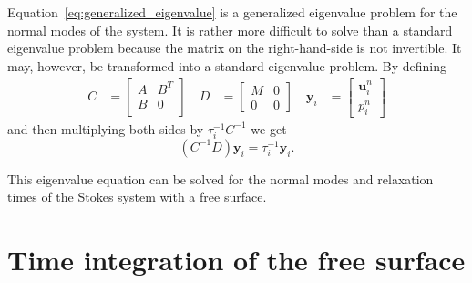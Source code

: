 \documentclass[preprint,12pt,authoryear]{elsarticle}
\begin{document}
Equation~\eqref{eq:generalized_eigenvalue} is a generalized eigenvalue problem for the normal modes of the system.
It is rather more difficult to solve than a standard eigenvalue problem because the matrix on the right-hand-side 
is not invertible. It may, however, be transformed into a standard eigenvalue problem.
By defining
\begin{equation}
\begin{aligned}
C &= 
\begin{bmatrix}
A & B^T \\
B & 0 \\
\end{bmatrix} \quad
D &= 
\begin{bmatrix}
M & 0 \\
0 & 0
\end{bmatrix} \quad
\mathbf{y}_i &= 
\begin{bmatrix}
\mathbf{u}^n_i \\
p^n_i
\end{bmatrix} 
\end{aligned}
\label{eq:eigen_substitution}
\end{equation}
and then multiplying both sides by $\tau_i^{-1}C^{-1}$ we get
\begin{equation}
(C^{-1}D)\mathbf{y}_i = \tau_i^{-1} \mathbf{y}_i.
\label{eq:standard_eigenvalue}
\end{equation}

This eigenvalue equation can be solved for the normal modes and relaxation times of the Stokes system with 
a free surface.

\section{Time integration of the free surface}
\label{sec:timestepping}
\end{document}
